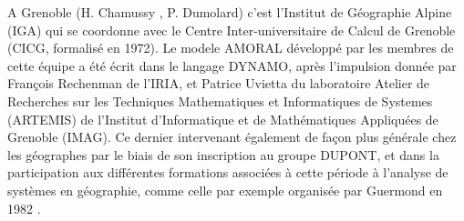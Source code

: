 
A Grenoble (H. Chamussy , P. Dumolard) c’est l’Institut de Géographie Alpine (IGA) qui se coordonne avec le Centre Inter-universitaire de Calcul de Grenoble (CICG, formalisé en 1972). Le modele AMORAL développé par les membres de cette équipe a été écrit dans le langage DYNAMO, après l'impulsion  donnée par François Rechenman de l'IRIA, et Patrice Uvietta du laboratoire Atelier de Recherches sur les Techniques Mathematiques et Informatiques de Systemes (ARTEMIS) de l’Institut d'Informatique et de Mathématiques Appliquées de Grenoble (IMAG). Ce dernier intervenant également de façon plus générale chez les géographes par le biais de son inscription au groupe DUPONT, et dans la participation aux différentes formations associées à cette période à l'analyse de systèmes en géographie, comme celle par exemple organisée par Guermond en 1982 \autocite{Guermond1984}.

